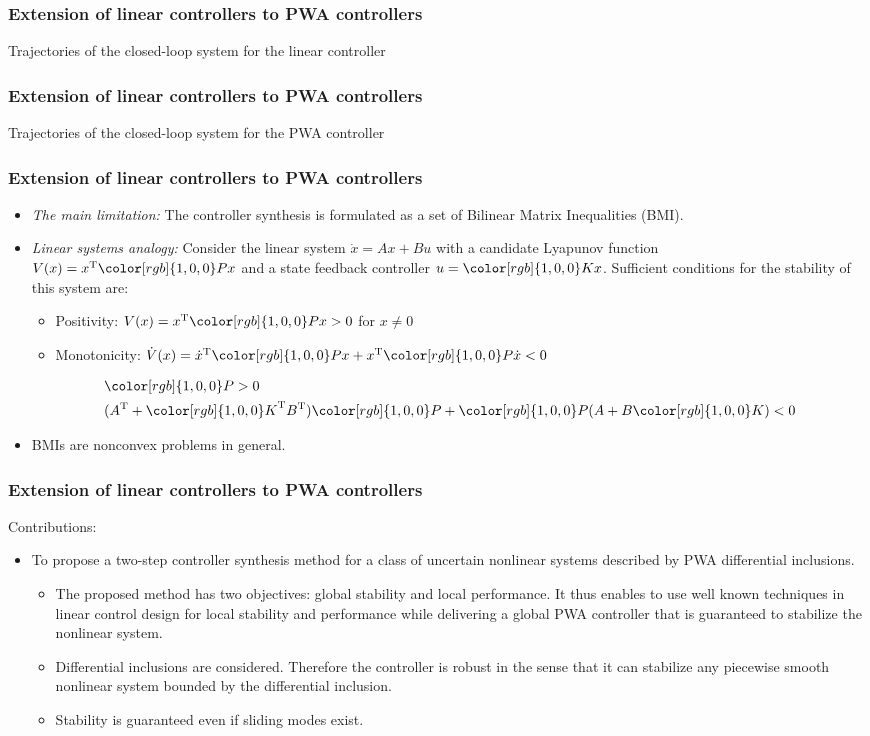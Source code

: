 \documentclass{beamer}
\newcommand{\red}{\color[rgb]{1,0,0}}
\newcommand{\TR}{\text{T}}
\begin{document}
  \frame
  {
    \frametitle{Extension of linear controllers to PWA controllers}
\centerline{\resizebox{9cm}{!}{}}
\centerline{Trajectories of the closed-loop system for the linear controller}
}

  \frame
  {
    \frametitle{Extension of linear controllers to PWA controllers}
\centerline{\resizebox{9cm}{!}{}}
\centerline{Trajectories of the closed-loop system for the PWA controller}
}
  
  \frame
  {
    \frametitle{Extension of linear controllers to PWA controllers}
    \begin{itemize}
    \item \emph{The main limitation:} The controller synthesis is formulated as a set of Bilinear Matrix Inequalities (BMI). 
    \item \emph{Linear systems analogy:} Consider the linear system $\dot x = Ax+Bu$ with a candidate Lyapunov function $V(x)=x^\TR {\red P}x$ and a state feedback controller $u={\red K}x$. Sufficient conditions for the stability of this system are: 
    \begin{itemize}
    \item Positivity: $V(x)=x^\TR{\red P}x>0$ for $x\neq 0$ 
    \item Monotonicity: $\dot V(x)=\dot x^\TR{\red P}x+ x^\TR{\red P}\dot x<0$
    \end{itemize}
    \begin{align}
    &{\red P}>0\nonumber\\
    &(A^\TR+{\red K}^\TR B^\TR) {\red P}+{\red P}(A+B{\red K})<0\nonumber
    \end{align}
    \item BMIs are nonconvex problems in general.
    \end{itemize}
}

 \frame
  {
    \frametitle{Extension of linear controllers to PWA controllers}
    Contributions:
    \begin{itemize}
    \item To propose a two-step controller synthesis method for a class of uncertain nonlinear systems described by PWA differential inclusions.
    \begin{itemize}
    \item The proposed method has two objectives: global stability and local performance. It thus enables to use well known techniques in linear control design for local stability and performance while delivering a global PWA controller that is guaranteed to stabilize the nonlinear system.
    \item Differential inclusions are considered. Therefore the controller is robust in the sense that it can stabilize any piecewise smooth nonlinear system bounded by the differential inclusion.
    \item Stability is guaranteed even if sliding modes exist.
    \end{itemize}
    \end{itemize}
}  
\end{document}
